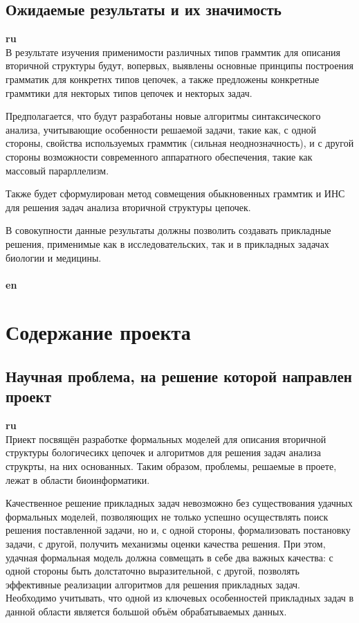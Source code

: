 \documentclass[12pt]{article}  %
\theoremstyle{remark}
\begin{document}
\subsection{Ожидаемые результаты и их значимость}

\textbf{ru}\\
В результате изучения применимости различных типов граммтик для описания вторичной структуры будут, вопервых, выявлены основные принципы построения грамматик для конкретнх типов цепочек, а также предложены конкретные граммтики для некторых типов цепочек и некторых задач.

Предполагается, что будут разработаны новые алгоритмы синтаксического анализа, учитывающие особенности решаемой задачи, такие как, с одной стороны, свойства используемых граммтик (сильная неоднозначность), и с другой стороны возможности современного аппаратного обеспечения, такие как массовый парарллелизм.

Также будет сформулирован метод совмещения обыкновенных граммтик и ИНС для решения задач анализа вторичной структуры цепочек.

В совокупности данные результаты должны позволить создавать прикладные решения, применимые как в исследовательских, так и в прикладных задачах биологии и медицины.
\\
\\
\textbf{en}\\


\section{Содержание проекта}

\subsection{Научная проблема, на решение которой направлен проект}

\textbf{ru}\\
Приект посвящён разработке формальных моделей для описания вторичной структуры бологичесикх цепочек и алгоритмов для решения задач анализа струкрты, на них основанных. Таким образом, проблемы, решаемые в проете, лежат в области биоинформатики.

Качественное решение прикладных задач невозможно без существования удачных формальных моделей, позволяющих не только успешно осуществлять поиск решения поставленной задачи, но и, с одной стороны, формализовать постановку задачи, с другой, получить механизмы оценки качества решения.
При этом, удачная формальная модель должна совмещать в себе два важных качества: с одной стороны быть долстаточно выразительной, с другой, позволять эффективные реализации алгоритмов для решения прикладных задач.
Необходимо учитывать, что одной из ключевых особенностей прикладных задач в данной области является большой объём обрабатываемых данных.
\end{document}

